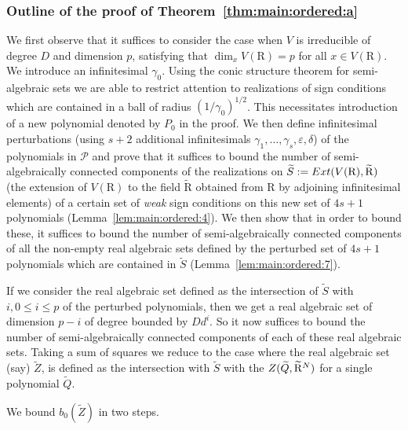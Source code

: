 \documentclass[10pt]{amsart}
\theoremstyle{definition}
\theoremstyle{remark}
\numberwithin{equation}{section}
\newcommand {\R} {\mathrm{R}}
\newcommand {\ZZ} {{\rm Z}}
\newcommand {\eps} {{\varepsilon}}
\newcommand {\E} {{\rm Ext}}
\begin{document}
\subsubsection{Outline of the proof of Theorem~\ref{thm:main:ordered:a}}
\label{subsec:outline:proof:thm:main:ordered:a}
We first observe that it suffices to consider the case when $V$ is irreducible of 
degree $D$ and dimension $p$, satisfying that $\dim_x V(\R) = p$ for all
$x \in V(\R)$. 
We introduce an infinitesimal $\gamma_0$.
Using the conic structure theorem for semi-algebraic sets \cite[Proposition 5.49]{BPRbook2} we 
are able to restrict attention to realizations of sign conditions
which are contained in a ball of radius $(1/\gamma_0)^{1/2}$. This necessitates introduction of a new polynomial denoted by $P_0$ in the proof.
We then define infinitesimal perturbations (using $s+2$ additional infinitesimals
$\gamma_1,\ldots,\gamma_s,\eps,\delta$) of the 
polynomials in $\mathcal{P}$ and prove that it suffices to bound the number of
semi-algebraically connected components of the 
realizations 
on $\widetilde{S} := \E(V(\R),\widetilde{\R})$ (the extension of 
$V(\R)$ to the field $\widetilde{\R}$ obtained from $\R$ by adjoining
infinitesimal elements)
of a certain set of \emph{weak} sign conditions
on this new set of $4s+1$
polynomials (Lemma~\ref{lem:main:ordered:4}).
We then show that in order to bound these,  it suffices to bound the number of semi-algebraically connected components of
all the non-empty real algebraic sets 
defined by the perturbed set of $4s +1$ polynomials
which are contained in $\widetilde{S}$ (Lemma~\ref{lem:main:ordered:7}).

If we consider the real algebraic set defined as the intersection of $\widetilde{S}$ with $i, 0 \leq i \leq p$ of the perturbed polynomials, then we get a real algebraic set of dimension $p-i$ of degree bounded by $D d^i$. 
So it now suffices to bound the number of semi-algebraically connected components of each of these 
real algebraic sets. Taking a sum of squares we reduce to the case where the real algebraic set (say)  $\widetilde{Z}$, is defined as the intersection with
$\widetilde{S}$ with the $\ZZ(\widetilde{Q}, \widetilde{\R}^N)$
for a single polynomial $\widetilde{Q}$.

We bound $b_0(\widetilde{Z})$ in two steps.
\end{document}
